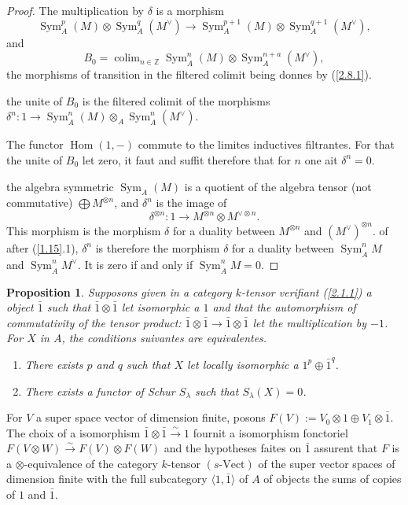 \documentclass[11pt,a4paper]{article}
\theoremstyle{plain}
\newtheorem{proposition}[theorem]{Proposition}
\theoremstyle{definition}
\DeclareMathOperator{\Hom}{Hom}
\DeclareMathOperator{\Sym}{Sym}
\DeclareMathOperator*{\colim}{colim}
\newcommand{\Vect}{\mathrm{Vect}}
\begin{document}
\begin{proof}
The multiplication by $\delta$ is a morphism
\begin{equation}\label{2.8.1}
\Sym^p_A(M)\otimes\Sym^q_A(M^\vee)\to\Sym^{p+1}_A(M)\otimes\Sym^{q+1}_A(M^\vee),
\end{equation}
and
\[
B_0=\colim_{n\in\mathbb{Z}}\Sym^n_A(M)\otimes\Sym^{n+a}_A(M^\vee),
\]
the morphisms of transition in the filtered colimit being donnes by (\ref{2.8.1}).

the unite of $B_0$ is the filtered colimit of the morphisms $\delta^n:1\to\Sym^n_A(M)\otimes_A\Sym^n_A(M^\vee)$.

The functor $\Hom(1,{-})$ commute to the limites inductives filtrantes. For that the unite of $B_0$ let zero, it faut and suffit therefore that for $n$ one ait $\delta^n=0$.

the algebra symmetric $\Sym_A(M)$ is a quotient of the algebra tensor (not commutative) $\bigoplus M^{\otimes n}$, and $\delta^n$ is the image of
\[
\delta^{\otimes n}:1\to M^{\otimes n}\otimes M^{\vee\otimes n}.
\]
This morphism is the morphism $\delta$ for a duality between $M^{\otimes n}$ and $(M^{\vee})^{\otimes n}$. of after (\ref{1.15}.1), $\delta^n$ is therefore the morphism $\delta$ for a duality between $\Sym^n_A M$ and $\Sym^n_A M^\vee$. It is zero if and only if $\Sym^n_A M=0$.
\end{proof}

\begin{proposition}\label{2.9}
Supposons given in a category $k$-tensor verifiant (\ref{2.1.1}) a object $\bar{1}$ such that $\bar{1}\otimes\bar{1}$ let isomorphic a $1$ and that the automorphism of commutativity of the tensor product: $\bar{1}\otimes\bar{1}\to\bar{1}\otimes\bar{1}$ let the multiplication by $-1$. For $X$ in $A$, the conditions suivantes are equivalentes.
\begin{enumerate}
\item[(i)] There exists $p$ and $q$ such that $X$ let locally isomorphic a $1^p\oplus\bar{1}^q$.
\item[(ii)] There exists a functor of Schur $S_\lambda$ such that $S_\lambda(X)=0$.
\end{enumerate}
\end{proposition}

For $V$ a super space vector of dimension finite, posons $F(V):=V_0\otimes1\oplus V_1\otimes\bar{1}$. The choix of a isomorphism $\bar{1}\otimes\bar{1}\xrightarrow{\sim}1$ fournit a isomorphism fonctoriel $F(V\otimes W)\xrightarrow{\sim}F(V)\otimes F(W)$ and the hypotheses faites on $\bar{1}$ assurent that $F$ is a $\otimes$-equivalence of the category $k$-tensor $(s\text{-}\Vect)$ of the super vector spaces of dimension finite with the full subcategory $\langle1,\bar{1}\rangle$ of $A$ of objects the sums of copies of $1$ and $\bar{1}$.
\end{document}
